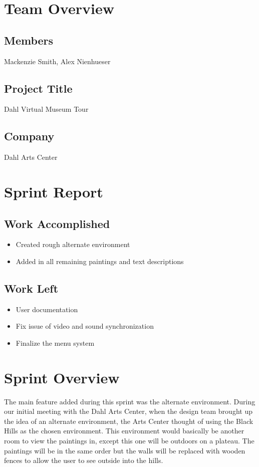 \documentclass[11pt]{book}
\begin{document}
\section*{Team Overview}
\hrulefill
\subsection*{Members}
Mackenzie Smith, Alex Nienhueser

\subsection*{Project Title}
Dahl Virtual Museum Tour

\subsection*{Company}
Dahl Arts Center


\section*{Sprint Report}

\hrulefill
\subsection*{Work Accomplished}
\begin{itemize}
\item Created rough alternate environment
\item Added in all remaining paintings and text descriptions


\end{itemize}
\subsection*{Work Left}
\begin{itemize}
\item User documentation
\item Fix issue of video and sound synchronization
\item Finalize the menu system
\end{itemize}

\section*{Sprint Overview}
The main feature added during this sprint was the alternate environment.  During our initial meeting with the Dahl Arts Center, when the design team brought up the idea of an alternate environment, the Arts Center thought of using the Black Hills as the chosen environment.  This environment would basically be another room to view the paintings in, except this one will be outdoors on a plateau.  The paintings will be in the same order but the walls will be replaced with wooden fences to allow the user to see outside into the hills.
\end{document}
